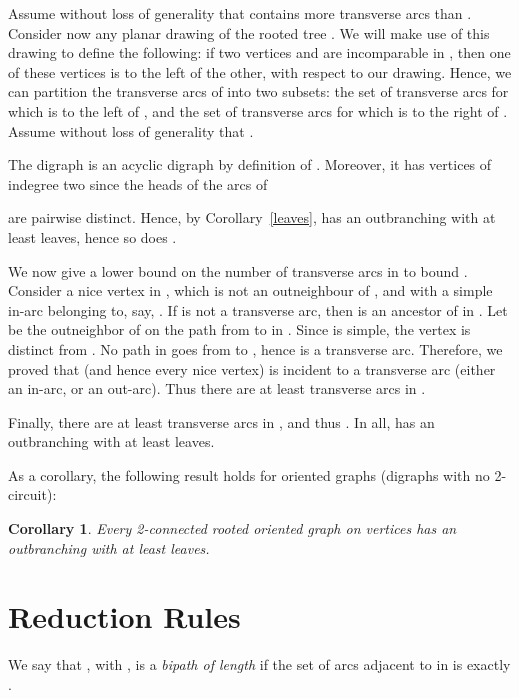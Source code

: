 \documentclass{article}
\newtheorem{coro}{Corollary}
\begin{document}
Assume without loss of generality that  contains more transverse
arcs than . Consider now any planar
drawing of the rooted tree . We will make use of this drawing to
define the following:
if two vertices  and  are incomparable in , then one of these
vertices is to the left of the other, with respect to our drawing.
Hence, we can
partition the transverse arcs of  into two subsets: the set 
of transverse arcs
 for which  is to the left of , and the set  of
transverse arcs
 for which  is to the right of . Assume without loss of
generality that .

The digraph  is an acyclic digraph by definition of .
Moreover,
it has  vertices of indegree two since the heads of the arcs of

are pairwise distinct. Hence, by Corollary~\ref{leaves}, 
has an outbranching
with at least  leaves, hence so does .

We now give a lower bound on the number of transverse arcs in  to
bound . Consider
a nice vertex  in , which is not an outneighbour of , and with a simple in-arc  belonging to, say,
. If  is not
a transverse arc, then  is an ancestor of  in . Let  be
the outneighbor of
 on the path from  to  in . Since  is simple, the
vertex  is distinct
from . No path in  goes from  to , hence  is a
transverse arc. Therefore,
we proved that  (and hence every nice vertex) is incident to a
transverse arc (either
an in-arc, or an out-arc). Thus there are at least 
transverse arcs in .

Finally, there are at least  transverse arcs in , and thus
. In all,
 has an outbranching with at least  leaves.











\vspace{12pt}



As a corollary, the following result holds for oriented graphs (digraphs with no 2-circuit):
\begin{coro}
Every 2-connected rooted oriented graph on  vertices has an outbranching with at least  leaves.
\end{coro}





\section{Reduction Rules}\label{srules}
 We say that , with , is a \emph{bipath of length } if the set of arcs adjacent to  in  is exactly .
\end{document}
